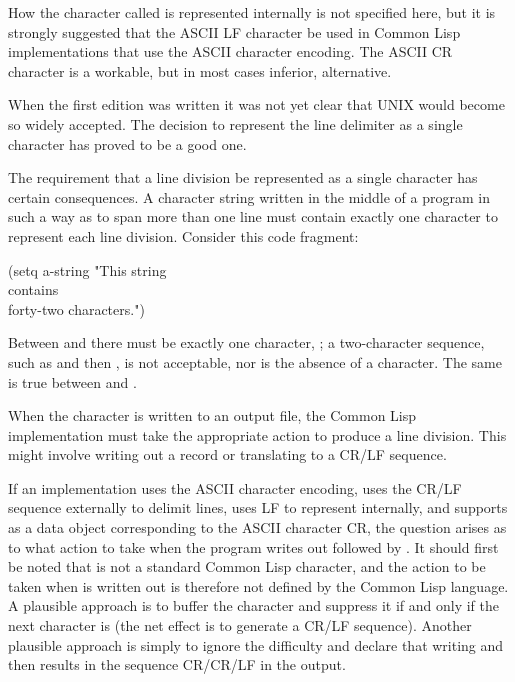 {\beforenoterule
\begin{implementation}
How the character called  is represented
internally is not specified here, but it is strongly suggested that
the ASCII LF character be used in Common Lisp implementations that use the
ASCII character encoding.  The ASCII CR character is a workable,
but in most cases inferior, alternative.
\end{implementation}
\afternoterule

\begin{newer}
When the first edition was written it was not yet clear that UNIX would
become so widely accepted.  The decision to represent
the line delimiter as a single character has proved to be a good one.
\end{newer}

The requirement that a line division be represented as a single character
has certain consequences.  A character string
written in the middle of a program in such a way as to span more than
one line must contain exactly one character to represent each line division.
Consider this code fragment:
\begin{lisp}
(setq a-string "This string \\
contains \\
forty-two characters.")
\end{lisp}
Between  and  there must be exactly one character,
; a two-character sequence, such as  and then
, is not acceptable, nor is the absence of a character.
The same is true between  and .

When the character  is written to an output file,
the Common Lisp implementation must take the appropriate action
to produce a line division.  This might involve writing out a
record or translating  to a CR/LF sequence.

\beforenoterule
\begin{implementation}
If an implementation uses the ASCII character encoding,
uses the CR/LF sequence externally to delimit lines,
uses LF to represent  internally, and supports 
as a data object corresponding to the ASCII character CR, the
question arises as to what action to take when the program
writes out  followed by .
It should first be noted that  is not a standard Common Lisp
character, and the action to be taken when  is written out
is therefore not defined by the Common Lisp language.  A plausible approach
is to buffer the  character and suppress it if and only if the
next character is  (the net effect is to generate a CR/LF
sequence).
Another plausible
approach is simply to ignore
the difficulty and declare that writing  and then
 results in the sequence CR/CR/LF in the output.
\end{implementation}
\afternoterule

}
